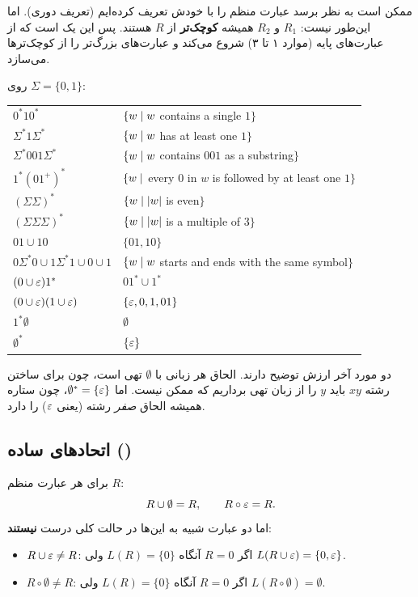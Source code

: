 \begin{note}
ممکن است به نظر برسد عبارت منظم را با خودش تعریف کرده‌ایم (تعریف دوری). اما این‌طور نیست: $R_1$ و $R_2$ همیشه \textbf{کوچک‌تر} از $R$ هستند. پس این یک  است که از عبارت‌های پایه (موارد ۱ تا ۳) شروع می‌کند و عبارت‌های بزرگ‌تر را از کوچک‌ترها می‌سازد.
\end{note}

\begin{example}
روی $\Sigma=\{0,1\}$:
\begin{ltrfig}
\renewcommand{\arraystretch}{1.25}
\begin{tabular}{ll}
$0^*10^*$ & $\{w\mid w$ contains a single $1\}$\\
$\Sigma^*1\Sigma^*$ & $\{w\mid w$ has at least one $1\}$\\
$\Sigma^*001\Sigma^*$ & $\{w\mid w$ contains $001$ as a substring$\}$\\
$1^*(01^+)^*$ & $\{w\mid$ every $0$ in $w$ is followed by at least one $1\}$\\
$(\Sigma\Sigma)^*$ & $\{w\mid |w|$ is even$\}$\\
$(\Sigma\Sigma\Sigma)^*$ & $\{w\mid |w|$ is a multiple of $3\}$\\
$01\cup10$ & $\{01,10\}$\\
$0\Sigma^*0\cup1\Sigma^*1\cup0\cup1$ & $\{w\mid w$ starts and ends with the same symbol$\}$\\
$(0\cup\varepsilon)1^*$ & $01^*\cup1^*$\\
$(0\cup\varepsilon)(1\cup\varepsilon)$ & $\{\varepsilon,0,1,01\}$\\
$1^*\emptyset$ & $\emptyset$\\
$\emptyset^*$ & $\{\varepsilon\}$
\end{tabular}
\end{ltrfig}
\end{example}

دو مورد آخر ارزش توضیح دارند. الحاق هر زبانی با $\emptyset$ تهی است، چون برای ساختن رشته $xy$ باید $y$ را از زبان تهی برداریم که ممکن نیست. اما $\emptyset^*=\{\varepsilon\}$، چون ستاره همیشه الحاق \emph{صفر} رشته (یعنی $\varepsilon$) را دارد.

\subsection{اتحادهای ساده ()}
برای هر عبارت منظم $R$:
\[R\cup\emptyset=R,\qquad R\circ\varepsilon=R.\]
اما دو عبارت شبیه به این‌ها در حالت کلی درست \textbf{نیستند}:
\begin{itemize}
\item $R\cup\varepsilon\neq R$: اگر $R=0$ آنگاه $L(R)=\{0\}$ ولی $L(R\cup\varepsilon)=\{0,\varepsilon\}$.
\item $R\circ\emptyset\neq R$: اگر $R=0$ آنگاه $L(R)=\{0\}$ ولی $L(R\circ\emptyset)=\emptyset$.
\end{itemize}

